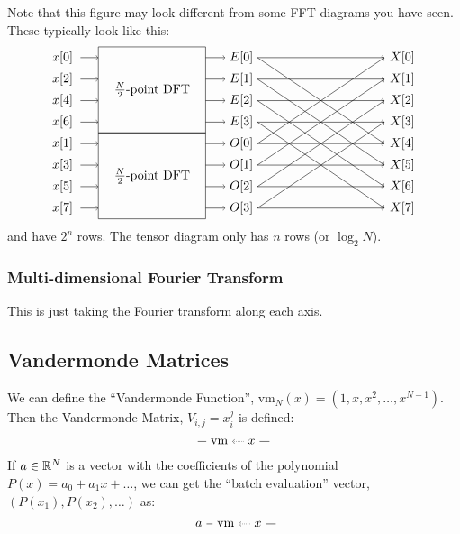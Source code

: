 Note that this figure may look different from some FFT diagrams you have seen.
These typically look like this:
\[
\begin{tikzpicture}
  \draw (0, -2.1) rectangle (3, .3) node[midway] {$\frac{N}{2}$-point DFT};
  \draw (0, -4.5) rectangle (3, -2.1) node[midway] {$\frac{N}{2}$-point DFT};

  \foreach \i in {0,2,4,6} {
    \node at (-1, - \i*0.3) {$x[\i]$};
    \draw[->] (-0.5, - \i*0.3) -- (0, - \i*0.3);
  }
  \foreach \i in {1,3,5,7} {
    \node at (-1, - \i*0.3 - 2.1) {$x[\i]$};
    \draw[->] (-0.5, - \i*0.3 - 2.1) -- (0, - \i*0.3 - 2.1);
  }
  \foreach \i in {0,1,2,3} {
    \node (E) at (4, - \i*0.6) {$E[\i]$};
    \draw[->] (3, - \i*0.6) -- (E.west);
    \draw[->] (E.east) -- (8, - \i*0.6);
    \draw[->] (E.east) -- (8, - \i*0.6 - 2.4);
  }
  \foreach \i in {0,1,2,3} {
    \node (O) at (4, - \i*0.6 - 2.4) {$O[\i]$};
    \draw[->] (3, - \i*0.6 - 2.4) -- (O.west);
    \draw[->] (O.east) -- (8, - \i*0.6);
    \draw[->] (O.east) -- (8, - \i*0.6 - 2.4);
  }
  \foreach \i in {0,...,7} {
    \node at (8.5, - \i*0.6) {$X[\i]$};
  }
\end{tikzpicture}
\]
and have $2^n$ rows.
The tensor diagram only has $n$ rows (or $\log_2 N$).

\subsubsection{Multi-dimensional Fourier Transform}
This is just taking the Fourier transform along each axis.

\subsection{Vandermonde Matrices}
We can define the ``Vandermonde Function'', $\mathrm{vm}_N(x) = (1, x, x^2, \dots, x^{N-1})$.
Then the Vandermonde Matrix, $V_{i,j}=x_i^j$ is defined:
\[
   \begin{tikzpicture}
      \node(vm) at (0,0) {vm};
      \node(x) at (.9,0) {$x$};
      \draw[densely dotted, ->] (x) -> (vm);
      \draw (x) -- ++(.5,0);
      \draw (vm) -- ++(-.6,0);
   \end{tikzpicture}
\]
If $a\in\mathbb R^N$ is a vector with the coefficients of the polynomial $P(x)=a_0 + a_1 x + \dots$, we can get the ``batch evaluation'' vector, $(P(x_1), P(x_2), \dots)$ as:
\[
   \begin{tikzpicture}
      \node(a) at (-.75,0) {$a$};
      \node(vm) at (0,0) {vm};
      \node(x) at (.9,0) {$x$};
      \draw[densely dotted, ->] (x) -> (vm);
      \draw (x) -- ++(.5,0);
      \draw (vm) -- (a);
   \end{tikzpicture}
\]

